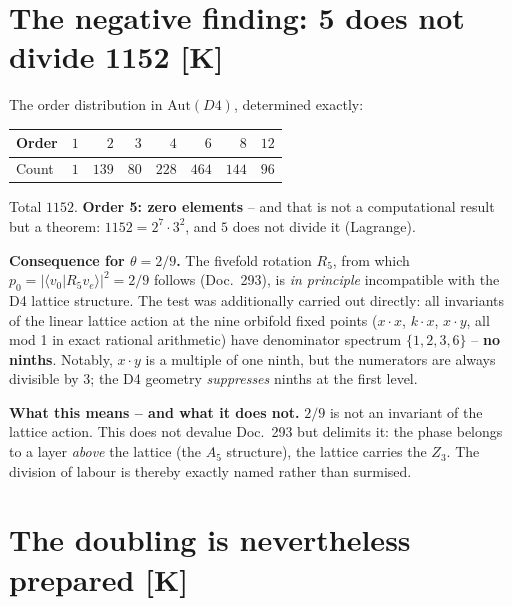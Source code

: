 \chapter{The negative finding: 5 does not divide 1152 [K]}

The order distribution in $\text{Aut}(D4)$, determined exactly:

\begin{center}
\begin{tabular}{lrrrrrrr}
\toprule
Order & $1$ & $2$ & $3$ & $4$ & $6$ & $8$ & $12$ \\
\midrule
Count & $1$ & $139$ & $80$ & $228$ & $464$ & $144$ & $96$ \\
\bottomrule
\end{tabular}
\end{center}

Total $1152$. \textbf{Order 5: zero elements} -- and that is not a
computational result but a theorem: $1152 = 2^7\cdot3^2$, and $5$
does not divide it (Lagrange).

\textbf{Consequence for $\theta = 2/9$.} The fivefold rotation
$R_5$, from which $p_0 = |\langle v_0|R_5 v_e\rangle|^2 = 2/9$
follows (Doc.~293), is \emph{in principle} incompatible with the D4
lattice structure. The test was additionally carried out directly:
all invariants of the linear lattice action at the nine orbifold
fixed points ($x\!\cdot\!x$, $k\!\cdot\!x$, $x\!\cdot\!y$, all mod 1
in exact rational arithmetic) have denominator spectrum
$\{1,2,3,6\}$ -- \textbf{no ninths}. Notably, $x\!\cdot\!y$ is a
multiple of one ninth, but the numerators are always divisible by 3;
the D4 geometry \emph{suppresses} ninths at the first level.

\textbf{What this means -- and what it does not.} $2/9$ is not an
invariant of the lattice action. This does not devalue Doc.~293 but
delimits it: the phase belongs to a layer \emph{above} the lattice
(the $A_5$ structure), the lattice carries the $Z_3$. The division
of labour is thereby exactly named rather than surmised.

\chapter{The doubling is nevertheless prepared [K]}

